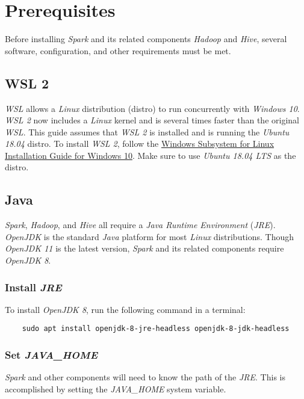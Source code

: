 \documentclass{article}
\begin{document}
\section{Prerequisites}
Before installing \emph{Spark} and its related components \emph{Hadoop} and \emph{Hive}, several
software, configuration, and other requirements must be met.

  \subsection{WSL 2}
  \emph{WSL} allows a \emph{Linux} distribution (distro) to run concurrently with
  \emph{Windows 10}. \emph{WSL 2} now includes a \emph{Linux} kernel and is several times faster
  than the original \emph{WSL}. This guide assumes that \emph{WSL 2} is installed and is running
  the \emph{Ubuntu 18.04} distro. To install \emph{WSL 2}, follow the
  \href{https://docs.microsoft.com/en-us/windows/wsl/install-win10}{Windows Subsystem
  for Linux Installation Guide for Windows 10}. Make sure to use \emph{Ubuntu 18.04 LTS} as the
  distro.

  \subsection{Java}
  \emph{Spark}, \emph{Hadoop}, and \emph{Hive} all require a \emph{Java Runtime Environment}
  (\emph{JRE}). \emph{OpenJDK} is the standard \emph{Java} platform for most \emph{Linux}
  distributions. Though \emph{OpenJDK 11} is the latest version, \emph{Spark} and its related
  components require \emph{OpenJDK 8}.

    \subsubsection{Install \emph{JRE}}
    To install \emph{OpenJDK 8}, run the following command in a terminal:
    \begin{verbatim}
    sudo apt install openjdk-8-jre-headless openjdk-8-jdk-headless  
    \end{verbatim}

    \subsubsection{Set \emph{JAVA\_HOME}}
    \label{subsec:javahome}
    \emph{Spark} and other components will need to know the path of the
    \emph{JRE}. This is accomplished by setting the \emph{JAVA\_HOME}
    system variable.
\end{document}
